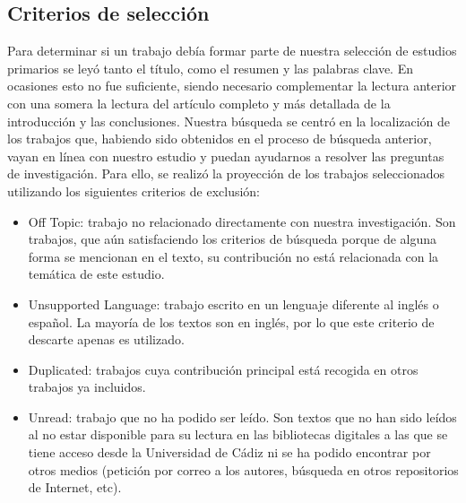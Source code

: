 \subsection{Criterios de selección}
Para determinar si un trabajo debía formar parte de nuestra selección de estudios primarios se leyó tanto el título, como el resumen y las palabras clave. En ocasiones esto no fue suficiente, siendo necesario complementar la lectura anterior con una somera la lectura del artículo completo y más detallada de la introducción y las conclusiones.
Nuestra búsqueda se centró en la localización de los trabajos que, habiendo sido obtenidos en el proceso de búsqueda anterior, vayan en línea con nuestro estudio y puedan ayudarnos a resolver las preguntas de investigación. Para ello, se realizó la proyección de los trabajos seleccionados utilizando los siguientes criterios de exclusión:
\begin{itemize}
\item Off Topic: trabajo no relacionado directamente con nuestra investigación. Son trabajos, que aún satisfaciendo los criterios de búsqueda porque de alguna forma se mencionan en el texto, su contribución no está relacionada con la temática de este estudio.
\item Unsupported Language: trabajo escrito en un lenguaje diferente al inglés o español. La mayoría de los textos son en inglés, por lo que este criterio de descarte apenas es utilizado.
\item Duplicated: trabajos cuya contribución principal está recogida en otros trabajos ya incluidos. 
\item Unread: trabajo que no ha podido ser leído. Son textos que no han sido leídos al no estar disponible para su lectura en las bibliotecas digitales a las que se tiene acceso desde la Universidad de Cádiz ni se ha podido encontrar por otros medios (petición por correo a los autores, búsqueda en otros repositorios de Internet, etc).
\end{itemize}


